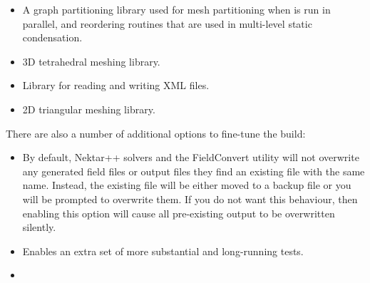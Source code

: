 \begin{itemize}
    \item {}

    A graph partitioning library used for mesh partitioning when \nekpp is run
    in parallel, and reordering routines that are used in multi-level static
    condensation.

    \item {}
    
    3D tetrahedral meshing library.
    
    \item {}

    Library for reading and writing XML files.
    
    \item {}
    
    2D triangular meshing library.
\end{itemize}

There are also a number of additional options to fine-tune the build:
\begin{itemize}
    \item {}

    By default, Nektar++ solvers and the FieldConvert utility will not overwrite
    any generated field files or output files they find an existing file with
    the same name. Instead, the existing file will be either moved to a backup
    file or you will be prompted to overwrite them. If you do not want this
    behaviour, then enabling this option will cause all pre-existing output to
    be overwritten silently.

    \item {}
    
    Enables an extra set of more substantial and long-running tests.
    
    \item {}
    
    
\end{itemize}